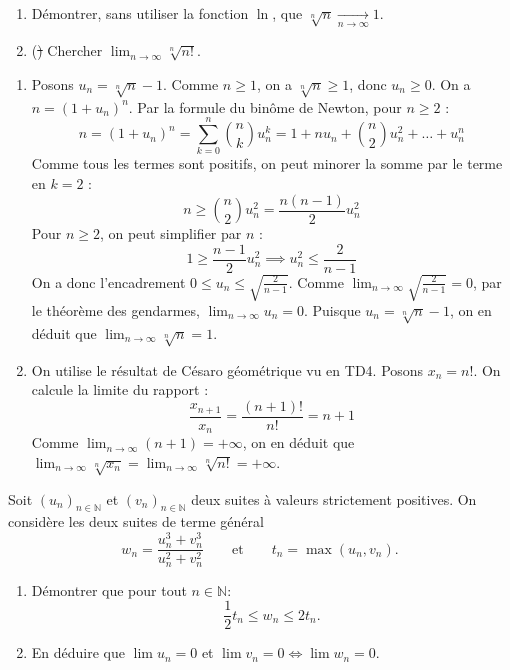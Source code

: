 \documentclass[solutions]{exercices}
\begin{document}
\begin{exercice}
	\begin{enumerate}
		\item Démontrer, sans utiliser la fonction $\ln$, que $\sqrt[n]n \xrightarrow[n\to\infty]{} 1$.
		\item (\st) Chercher $\lim_{n\to\infty} \sqrt[n]{n!}$.
	\end{enumerate}
\end{exercice}

\begin{solution}
	\begin{enumerate}
		\item Posons $u_n = \sqrt[n]{n} - 1$. Comme $n \ge 1$, on a $\sqrt[n]{n} \ge 1$, donc $u_n \ge 0$.
		      On a $n = (1+u_n)^n$. Par la formule du binôme de Newton, pour $n \ge 2$ :
		      \[ n = (1+u_n)^n = \sum_{k=0}^n \binom{n}{k} u_n^k = 1 + nu_n + \binom{n}{2}u_n^2 + \dots + u_n^n \]
		      Comme tous les termes sont positifs, on peut minorer la somme par le terme en $k=2$ :
		      \[ n \ge \binom{n}{2}u_n^2 = \frac{n(n-1)}{2}u_n^2 \]
		      Pour $n \ge 2$, on peut simplifier par $n$ :
		      \[ 1 \ge \frac{n-1}{2}u_n^2 \implies u_n^2 \le \frac{2}{n-1} \]
		      On a donc l'encadrement $0 \le u_n \le \sqrt{\frac{2}{n-1}}$.
		      Comme $\lim_{n\to\infty} \sqrt{\frac{2}{n-1}} = 0$, par le théorème des gendarmes, $\lim_{n\to\infty} u_n = 0$.
		      Puisque $u_n = \sqrt[n]{n} - 1$, on en déduit que $\lim_{n\to\infty} \sqrt[n]{n} = 1$.
		\item On utilise le résultat de Césaro géométrique vu en TD4. Posons $x_n = n!$.
		      On calcule la limite du rapport :
		      \[ \frac{x_{n+1}}{x_n} = \frac{(n+1)!}{n!} = n+1 \]
		      Comme $\lim_{n\to\infty} (n+1) = +\infty$, on en déduit que $\lim_{n\to\infty} \sqrt[n]{x_n} = \lim_{n\to\infty} \sqrt[n]{n!} = +\infty$.
	\end{enumerate}
\end{solution}

\begin{exercice}[\di]
	Soit $(u_n)_{n \in \mathbb{N}}$ et $(v_n)_{n \in \mathbb{N}}$ deux suites à valeurs strictement positives. On considère les deux suites de terme général
	\[w_n=\dfrac{u_n^3+v_n^3}{u_n^2+v_n^2}\quad\quad \mbox{et}\quad\quad t_n=\max(u_n,v_n).\]
	\begin{enumerate}
		\item Démontrer que pour tout $ n\in\mathbb{N}$:
		      \[
			      \frac12t_n\le w_n\le 2 t_n.
		      \]
		\item En déduire que $\lim u_n=0$ et $\lim v_n=0 \iff \lim w_n=0$.
	\end{enumerate}
\end{exercice}
\end{document}
